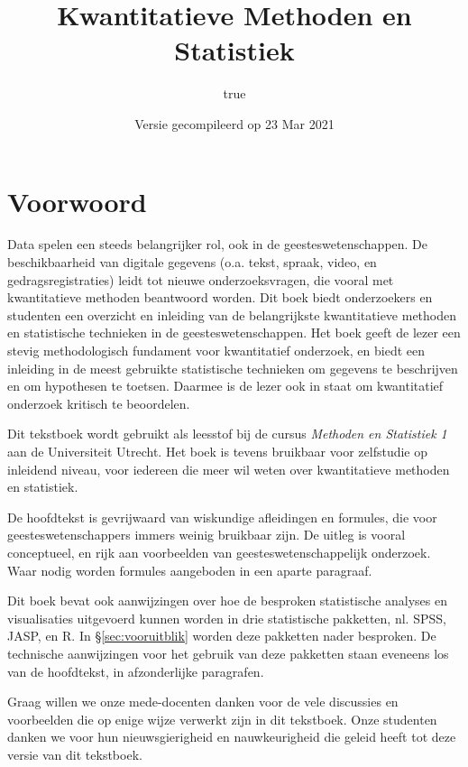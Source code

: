 \documentclass[
]{book}
\title{Kwantitatieve Methoden en Statistiek}
\author{true}
\date{Versie gecompileerd op 23 Mar 2021}
\begin{document}
\maketitle

{
\setcounter{tocdepth}{1}
\tableofcontents
}
\hypertarget{voorwoord}{%
\chapter*{Voorwoord}\label{voorwoord}}

Data spelen een steeds belangrijker rol, ook in de geesteswetenschappen.
De beschikbaarheid van digitale gegevens (o.a. tekst, spraak, video, en gedragsregistraties) leidt tot nieuwe onderzoeksvragen, die vooral met kwantitatieve methoden beantwoord worden.
Dit boek biedt onderzoekers en studenten een overzicht en inleiding van de belangrijkste kwantitatieve methoden en statistische technieken in de geesteswetenschappen. Het boek geeft de lezer een stevig methodologisch fundament voor kwantitatief onderzoek, en biedt een inleiding in de meest gebruikte statistische technieken om gegevens te beschrijven en om hypothesen te toetsen. Daarmee is de lezer ook in staat om kwantitatief onderzoek kritisch te beoordelen.

Dit tekstboek wordt gebruikt als leesstof bij de cursus \emph{Methoden en Statistiek 1} aan de Universiteit Utrecht. Het boek is tevens bruikbaar voor zelfstudie op inleidend niveau, voor iedereen die meer wil weten over kwantitatieve methoden en statistiek.

De hoofdtekst is gevrijwaard van wiskundige afleidingen en formules, die voor geesteswetenschappers immers weinig bruikbaar zijn. De uitleg is vooral conceptueel, en rijk aan voorbeelden van geesteswetenschappelijk onderzoek. Waar nodig worden formules aangeboden in een aparte paragraaf.

Dit boek bevat ook aanwijzingen over hoe de besproken statistische analyses en visualisaties uitgevoerd kunnen worden in drie statistische pakketten, nl. SPSS, JASP, en R. In §\ref{sec:vooruitblik} worden deze pakketten nader besproken. De technische aanwijzingen voor het gebruik van deze pakketten staan eveneens los van de hoofdtekst, in afzonderlijke paragrafen.

Graag willen we onze mede-docenten danken voor de vele discussies en voorbeelden die op enige wijze verwerkt zijn in dit tekstboek. Onze studenten danken we voor hun nieuwsgierigheid en nauwkeurigheid die geleid heeft tot deze versie van dit tekstboek.
\end{document}

